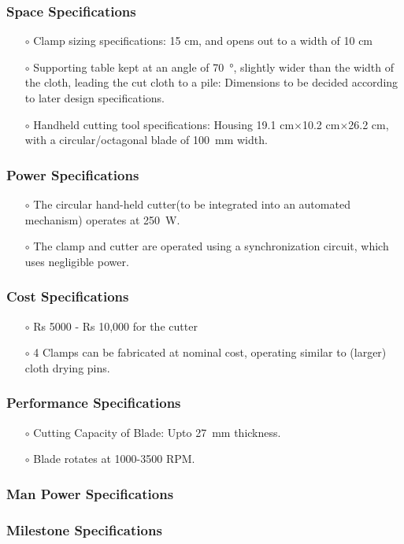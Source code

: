 \subsubsection{Space Specifications}
\begin{itemize}
    \item[$\scriptstyle\circ$] Clamp sizing specifications: 15 \unit{\centi\metre}, and opens out to a width of 10 \unit{\centi\metre}
    \item[$\scriptstyle\circ$] Supporting table kept at an angle of \SI{70}{\degree}, slightly wider than the width of the cloth, leading the cut cloth to a pile: Dimensions to be decided according to later design specifications. 
    \item[$\scriptstyle\circ$] Handheld cutting tool specifications: Housing 19.1 \unit{\centi\metre}$\times$10.2 \unit{\centi\metre}$\times$26.2 \unit{\centi\metre}, with a circular/octagonal blade of \SI{100}{\milli\meter} width.
\end{itemize}
\subsubsection{Power Specifications}
\begin{itemize}
    \item[$\scriptstyle\circ$] The circular hand-held cutter(to be integrated into an automated mechanism) operates at \SI{250}{\watt}.
    \item[$\scriptstyle\circ$] The clamp and cutter are operated using a synchronization circuit, which uses negligible power.
\end{itemize}
\subsubsection{Cost Specifications}
\begin{itemize}
    \item[$\scriptstyle\circ$] Rs 5000 - Rs 10,000 for the cutter
    \item[$\scriptstyle\circ$] 4 Clamps can be fabricated at nominal cost, operating similar to (larger) cloth drying pins. 
\end{itemize}
\subsubsection{Performance Specifications}
\begin{itemize}
    \item[$\scriptstyle\circ$] Cutting Capacity of Blade: Upto \SI{27}{\milli\meter} thickness. 
    \item[$\scriptstyle\circ$] Blade rotates at 1000-3500 RPM. \cite{noauthor_fabric_nodate} \cite{noauthor_yj-d108_nodate}
\end{itemize}
\subsubsection{Man Power Specifications}

\subsubsection{Milestone Specifications}